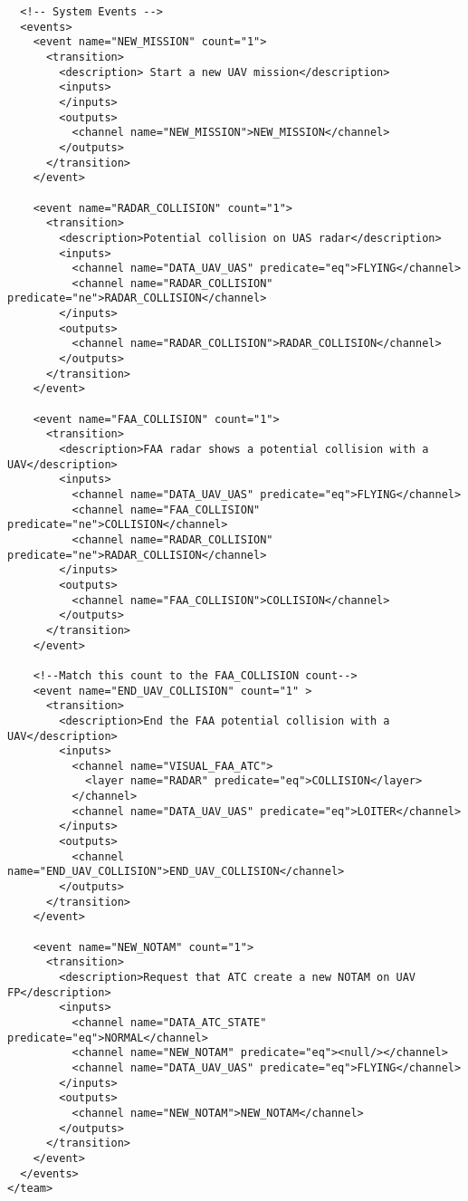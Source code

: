 \begin{verbatim}  
  <!-- System Events -->
  <events>
    <event name="NEW_MISSION" count="1">
      <transition>
        <description> Start a new UAV mission</description>
        <inputs>
        </inputs>
        <outputs>
          <channel name="NEW_MISSION">NEW_MISSION</channel>
        </outputs>
      </transition>
    </event>
    
    <event name="RADAR_COLLISION" count="1">
      <transition>
        <description>Potential collision on UAS radar</description>
        <inputs>
          <channel name="DATA_UAV_UAS" predicate="eq">FLYING</channel>
          <channel name="RADAR_COLLISION" predicate="ne">RADAR_COLLISION</channel>
        </inputs>
        <outputs>
          <channel name="RADAR_COLLISION">RADAR_COLLISION</channel>
        </outputs>
      </transition>
    </event>
    
    <event name="FAA_COLLISION" count="1">
      <transition>
        <description>FAA radar shows a potential collision with a UAV</description>
        <inputs>
          <channel name="DATA_UAV_UAS" predicate="eq">FLYING</channel>
          <channel name="FAA_COLLISION" predicate="ne">COLLISION</channel>
          <channel name="RADAR_COLLISION" predicate="ne">RADAR_COLLISION</channel>
        </inputs>
        <outputs>
          <channel name="FAA_COLLISION">COLLISION</channel>
        </outputs>
      </transition>
    </event>
    
    <!--Match this count to the FAA_COLLISION count-->
    <event name="END_UAV_COLLISION" count="1" >
      <transition>
        <description>End the FAA potential collision with a UAV</description>
        <inputs>
          <channel name="VISUAL_FAA_ATC">
            <layer name="RADAR" predicate="eq">COLLISION</layer>
          </channel>
          <channel name="DATA_UAV_UAS" predicate="eq">LOITER</channel>
        </inputs>
        <outputs>
          <channel name="END_UAV_COLLISION">END_UAV_COLLISION</channel>
        </outputs>
      </transition>
    </event>
    
    <event name="NEW_NOTAM" count="1">
      <transition>
        <description>Request that ATC create a new NOTAM on UAV FP</description>
        <inputs>
          <channel name="DATA_ATC_STATE" predicate="eq">NORMAL</channel>
          <channel name="NEW_NOTAM" predicate="eq"><null/></channel>
          <channel name="DATA_UAV_UAS" predicate="eq">FLYING</channel>
        </inputs>
        <outputs>
          <channel name="NEW_NOTAM">NEW_NOTAM</channel>
        </outputs>
      </transition>
    </event>
  </events>
</team>

\end{verbatim}